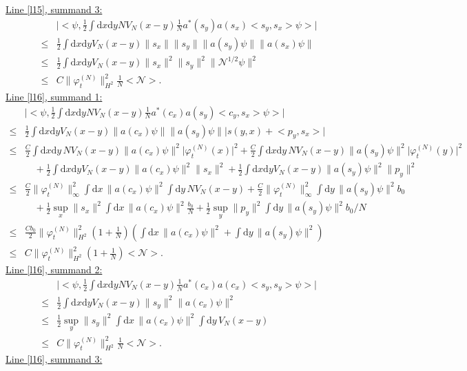 \documentclass[11pt,a4paper]{scrartcl}
\newcommand{\di}{\textrm{d}}		%
\newcommand{\Ncal}{\mathcal{N}}		%
\newcommand{\estlist}[2]{\underline{Line \ref{l#1}, summand #2:}}
\newcommand{\scal}[2]{\big<#1,#2\big>} %
\newcommand{\norm}[1]{\lVert#1\rVert}	%
\newcommand{\ev}[1]{\big<#1\big>}	%
\newcommand{\ph}{\varphi_t^{(N)}}	%
\newcommand{\dxyNV}{\frac{1}{2}\int \di x\di y N V_N(x-y)} %
\newcommand{\dxyV}{\frac{1}{2}\int \di x\di y V_N(x-y)} %
\begin{document}
\estlist{15}{3}
\begin{align*}
& \lvert \scal{\psi}{\dxyNV \frac{1}{N} a^\ast(s_y) a(s_x) \scal{s_y}{s_x}\psi} \rvert \\
\leq & \dxyV \norm{s_x} \norm{s_y} \norm{a(s_y)\psi} \norm{a(s_x)\psi} \\
\leq & \dxyV \norm{s_x}^2 \norm{s_y}^2 \norm{\Ncal^{1/2}\psi}^2 \\
\leq & C\norm{\ph}_{H^2}^2 \frac{1}{N}\ev{\Ncal}.
\end{align*}
\estlist{16}{1}
\begin{align*}
& \lvert \scal{\psi}{\dxyNV \frac{1}{N}a^\ast(c_x) a(s_y) \scal{c_y}{s_x}\psi} \rvert \\
\leq & \dxyV \norm{a(c_x)\psi} \norm{a(s_y)\psi} \lvert s(y,x)+\scal{p_y}{s_x} \rvert \\
\leq & \frac{C}{2}\int \di x\di y\, N V_N(x-y) \norm{a(c_x)\psi}^2 \lvert \ph(x)\rvert^2 + \frac{C}{2}\int \di x\di y\, N V_N(x-y) \norm{a(s_y)\psi}^2 \lvert \ph(y)\rvert^2\\
& \quad + \dxyV \norm{a(c_x)\psi}^2 \norm{s_x}^2 + \dxyV \norm{a(s_y)\psi}^2 \norm{p_y}^2 \\
\leq & \frac{C}{2} \norm{\ph}_\infty^2 \int \di x\, \norm{a(c_x)\psi}^2 \int \di y\, NV_N(x-y) + \frac{C}{2} \norm{\ph}_\infty^2 \int \di y\, \norm{a(s_y)\psi}^2 b_0 \\
& \quad + \frac{1}{2}\sup_x\norm{s_x}^2 \int \di x\, \norm{a(c_x)\psi}^2 \frac{b_0}{N} + \frac{1}{2} \sup_y \norm{p_y}^2 \int \di y\, \norm{a(s_y)\psi}^2 b_0/N \\
\leq & \frac{C b_0}{2} \norm{\ph}_{H^2}^2(1+\frac{1}{N})\left( \int \di x\,\norm{a(c_x)\psi}^2 + \int \di y\,\norm{a(s_y)\psi}^2 \right) \\
\leq & C\norm{\ph}_{H^2}^2 (1+\frac{1}{N})\ev{\Ncal}.
\end{align*}
\estlist{16}{2}
\begin{align*}
& \lvert \scal{\psi}{\dxyNV \frac{1}{N} a^\ast(c_x) a(c_x)\scal{s_y}{s_y}\psi} \rvert \\
\leq & \dxyV \norm{s_y}^2 \norm{a(c_x)\psi}^2 \\
\leq & \frac{1}{2} \sup_y \norm{s_y}^2 \int \di x\, \norm{a(c_x)\psi}^2 \int \di y\, V_N(x-y) \\
\leq & C\norm{\ph}_{H^2}^2 \frac{1}{N}\ev{\Ncal}.
\end{align*}
\estlist{16}{3}
\end{document}

